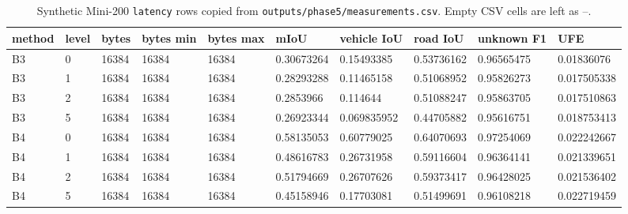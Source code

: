 \begin{table}[t]
\centering
\caption{Synthetic Mini-200 \texttt{latency} rows copied from \texttt{outputs/phase5/measurements.csv}. Empty CSV cells are left as --.}
\label{tab:latency}
\scriptsize
\setlength{\tabcolsep}{3pt}
\begin{tabular}{llllllllll}
\toprule
method & level & bytes & bytes min & bytes max & mIoU & vehicle IoU & road IoU & unknown F1 & UFE \\
\midrule
B3 & 0 & 16384 & 16384 & 16384 & 0.30673264 & 0.15493385 & 0.53736162 & 0.96565475 & 0.01836076 \\
B3 & 1 & 16384 & 16384 & 16384 & 0.28293288 & 0.11465158 & 0.51068952 & 0.95826273 & 0.017505338 \\
B3 & 2 & 16384 & 16384 & 16384 & 0.2853966 & 0.114644 & 0.51088247 & 0.95863705 & 0.017510863 \\
B3 & 5 & 16384 & 16384 & 16384 & 0.26923344 & 0.069835952 & 0.44705882 & 0.95616751 & 0.018753413 \\
B4 & 0 & 16384 & 16384 & 16384 & 0.58135053 & 0.60779025 & 0.64070693 & 0.97254069 & 0.022242667 \\
B4 & 1 & 16384 & 16384 & 16384 & 0.48616783 & 0.26731958 & 0.59116604 & 0.96364141 & 0.021339651 \\
B4 & 2 & 16384 & 16384 & 16384 & 0.51794669 & 0.26707626 & 0.59373417 & 0.96428025 & 0.021536402 \\
B4 & 5 & 16384 & 16384 & 16384 & 0.45158946 & 0.17703081 & 0.51499691 & 0.96108218 & 0.022719459 \\
\bottomrule
\end{tabular}
\end{table}
